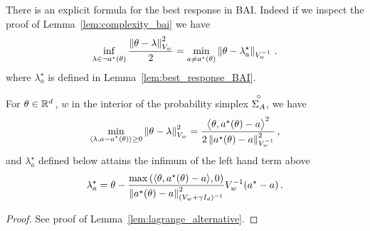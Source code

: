 There is an explicit formula for the best response in BAI. Indeed if we inspect the proof of Lemma~\ref{lem:complexity_bai} we have
\[
\inf_{\lambda\in \neg a^\star(\theta)} \frac{\left\lVert\theta - \lambda\right\rVert_{V_w}^2}{2} = \min_{a \neq a^\star(\theta)} \left\lVert\theta-\lambda^\star_a\right\rVert_{V_w^{-1}}\,.
\]
where $\lambda^\star_a$ is defined in Lemma~\ref{lem:best_response_BAI}.

\begin{lemma}
\label{lem:best_response_BAI}
For $\theta \in\mathbb{R}^d\,$, $w$ in the interior of the probability simplex $\overset{\circ}{\Sigma_A}$, we have
\[
\min_{\substack{\langle \lambda,a-a^\star(\theta)\rangle\geq 0}} \left\lVert\theta -\lambda \right\rVert_{V_w}^2 = \frac{\big\langle \theta, a^\star(\theta)-a\big\rangle^2}{2 \left\lVert a^\star(\theta)-a\right\rVert_{V_w^{-1}}^2}\,,
\]
and $\lambda^\star_a$ defined below attains the infimum of the left hand term above
\[
\lambda^\star_a = \theta - \frac{\max\left(\langle \theta, a^\star(\theta)-a\rangle,0\right)}{\left\lVert a^\star(\theta)-a\right\rVert^2_{(V_w+\gamma I_d)^{-1}}} V_w^{-1}(a^\star - a)\,.
\]
\end{lemma}
\begin{proof}
See proof of Lemma~\ref{lem:lagrange_alternative}.
\end{proof}

